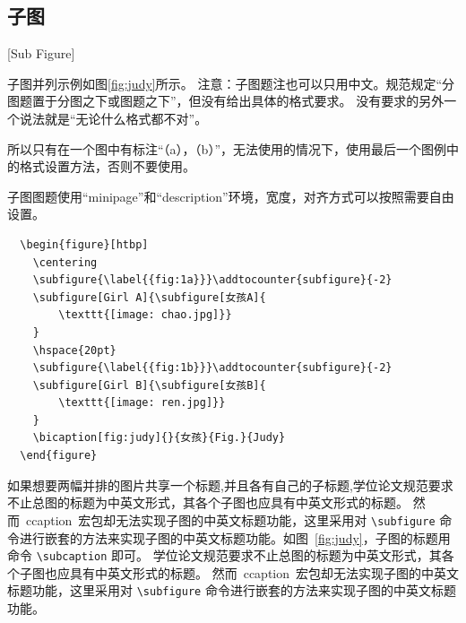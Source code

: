 \begin{figure}[htbp]
\begin{minipage}[t]{0.4\textwidth}
  \end{minipage}
\end{figure}

\subsection{子图}[Sub Figure]

子图并列示例如图\ref{fig:judy}所示。
注意：子图题注也可以只用中文。规范规定“分图题置于分图之下或图题之下”，但没有给出具体的格式要求。
没有要求的另外一个说法就是“无论什么格式都不对”。

所以只有在一个图中有标注“（a），（b）”，无法使用的情况下，使用最后一个图例中的格式设置方法，否则不要使用。

子图图题使用“minipage”和“description”环境，宽度，对齐方式可以按照需要自由设置。

\begin{figure}[htbp]
  \centering
  \addtocounter{subfigure}{-2}
  \hspace{20pt}
  \addtocounter{subfigure}{-2}
\end{figure}

\begin{lstlisting}
  \begin{figure}[htbp]
    \centering
    \subfigure{\label{{fig:1a}}}\addtocounter{subfigure}{-2}
    \subfigure[Girl A]{\subfigure[女孩A]{
        \texttt{[image: chao.jpg]}}
    }
    \hspace{20pt}
    \subfigure{\label{{fig:1b}}}\addtocounter{subfigure}{-2}
    \subfigure[Girl B]{\subfigure[女孩B]{
        \texttt{[image: ren.jpg]}}
    }
    \bicaption[fig:judy]{}{女孩}{Fig.}{Judy}
  \end{figure}
\end{lstlisting}


如果想要两幅并排的图片共享一个标题,并且各有自己的子标题,学位论文规范要求不止总图的标题为中英文形式，其各个子图也应具有中英文形式的标题。
然而~ccaption~宏包却无法实现子图的中英文标题功能，这里采用对 \verb|\subfigure| 命令进行嵌套的方法来实现子图的中英文标题功能。如图~\ref{fig:judy}，子图的标题用命令 \verb|\subcaption| 即可。
学位论文规范要求不止总图的标题为中英文形式，其各个子图也应具有中英文形式的标题。
然而~ccaption~宏包却无法实现子图的中英文标题功能，这里采用对 \verb|\subfigure| 命令进行嵌套的方法来实现子图的中英文标题功能。

